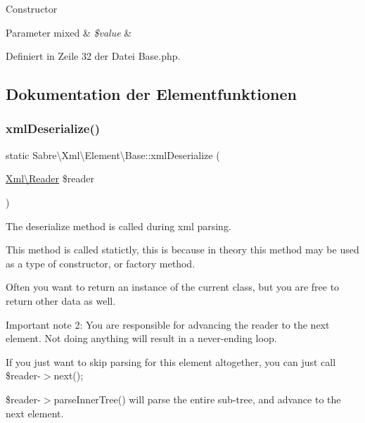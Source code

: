 Constructor


\begin{DoxyParams}[1]{Parameter}
mixed & {\em \$value} & \\
\hline
\end{DoxyParams}


Definiert in Zeile 32 der Datei Base.\+php.



\subsection{Dokumentation der Elementfunktionen}
\mbox{\label{class_sabre_1_1_xml_1_1_element_1_1_base_a7358dc9b94ce28633227d15cf95b3e80}} 
\subsubsection{\texorpdfstring{xml\+Deserialize()}{xmlDeserialize()}}
{\footnotesize\ttfamily static Sabre\textbackslash{}\+Xml\textbackslash{}\+Element\textbackslash{}\+Base\+::xml\+Deserialize (\begin{DoxyParamCaption}\item[{\mbox{\hyperlink{class_sabre_1_1_xml_1_1_reader}{Xml\textbackslash{}\+Reader}}}]{\$reader }\end{DoxyParamCaption})\hspace{0.3cm}{\ttfamily [static]}}

The deserialize method is called during xml parsing.

This method is called statictly, this is because in theory this method may be used as a type of constructor, or factory method.

Often you want to return an instance of the current class, but you are free to return other data as well.

Important note 2\+: You are responsible for advancing the reader to the next element. Not doing anything will result in a never-\/ending loop.

If you just want to skip parsing for this element altogether, you can just call \$reader-\/$>$next();

\$reader-\/$>$parse\+Inner\+Tree() will parse the entire sub-\/tree, and advance to the next element.


